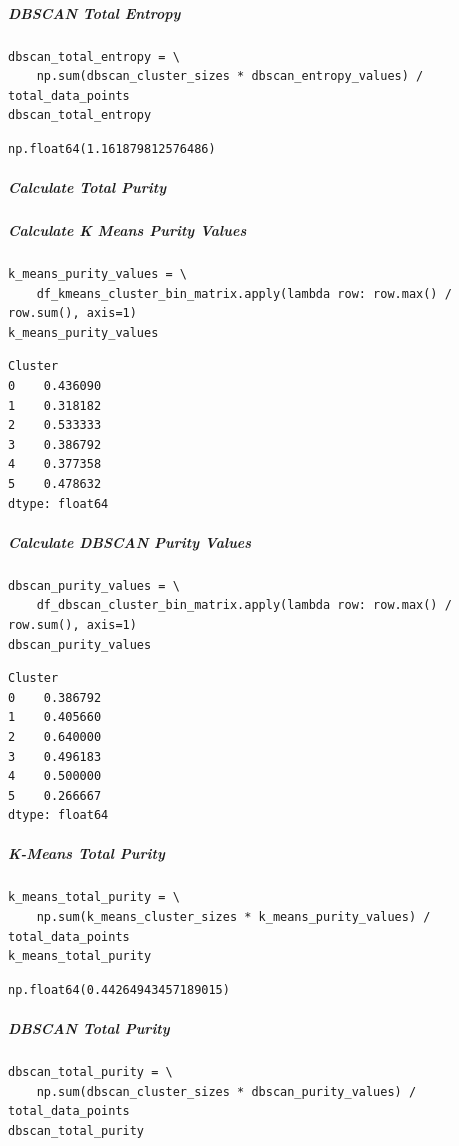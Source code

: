 \subparagraph{DBSCAN Total Entropy}

\begin{verbatim}
dbscan_total_entropy = \
    np.sum(dbscan_cluster_sizes * dbscan_entropy_values) / total_data_points
dbscan_total_entropy
\end{verbatim}

\begin{verbatim}
np.float64(1.161879812576486)
\end{verbatim}

\subparagraph{Calculate Total Purity}

\subparagraph{Calculate K Means Purity Values}

\begin{verbatim}
k_means_purity_values = \
    df_kmeans_cluster_bin_matrix.apply(lambda row: row.max() / row.sum(), axis=1)
k_means_purity_values
\end{verbatim}

\begin{verbatim}
Cluster
0    0.436090
1    0.318182
2    0.533333
3    0.386792
4    0.377358
5    0.478632
dtype: float64
\end{verbatim}

\subparagraph{Calculate DBSCAN Purity Values}

\begin{verbatim}
dbscan_purity_values = \
    df_dbscan_cluster_bin_matrix.apply(lambda row: row.max() / row.sum(), axis=1)
dbscan_purity_values
\end{verbatim}

\begin{verbatim}
Cluster
0    0.386792
1    0.405660
2    0.640000
3    0.496183
4    0.500000
5    0.266667
dtype: float64
\end{verbatim}

\subparagraph{K-Means Total Purity}

\begin{verbatim}
k_means_total_purity = \
    np.sum(k_means_cluster_sizes * k_means_purity_values) / total_data_points
k_means_total_purity
\end{verbatim}

\begin{verbatim}
np.float64(0.44264943457189015)
\end{verbatim}

\subparagraph{DBSCAN Total Purity}

\begin{verbatim}
dbscan_total_purity = \
    np.sum(dbscan_cluster_sizes * dbscan_purity_values) / total_data_points
dbscan_total_purity
\end{verbatim}

